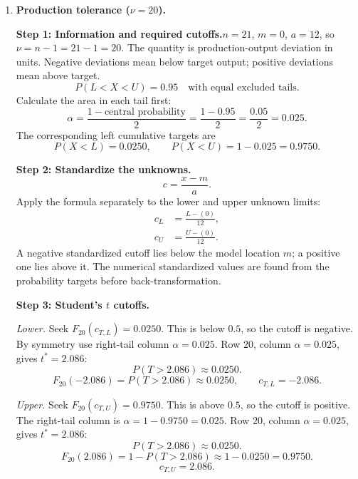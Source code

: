 \begin{enumerate}[leftmargin=*,label=\textbf{\arabic*.},itemsep=12pt,parsep=3pt,topsep=5pt]
\par\noindent\begin{minipage}{\linewidth}
\par\textbf{Step 7: Interpretation.}\nopagebreak\enspace About $10\%$ of waiting-time deviations lie below $-5.78$ minutes under $t$, or below $-5.40$ minutes under normal. Thus the thresholds represent about $5.78$ or $5.40$ minutes earlier than scheduled, respectively. The normal cutoff is $0.38$ minutes closer to the mean.
\end{minipage}\par
\item \begin{minipage}[t]{\linewidth}\textbf{Production tolerance ($\nu=20$).}\nopagebreak
\par\textbf{Step 1: Information and required cutoffs.}\nopagebreak\enspace $n=21$, $m=0$, $a=12$, so $\nu=n-1=21-1=20$. The quantity is production-output deviation in units. Negative deviations mean below target output; positive deviations mean above target.\[
P(L<X<U)=0.95\quad\text{with equal excluded tails}.
\]
Calculate the area in each tail first:\[
\alpha=\frac{1-\text{central probability}}{2}=\frac{1-0.95}{2}=\frac{0.05}{2}=0.025.
\]
The corresponding left cumulative targets are\[
P(X<L)=0.0250,\qquad P(X<U)=1-0.025=0.9750.
\]

\end{minipage}\par
\par\noindent\begin{minipage}{\linewidth}
\par\textbf{Step 2: Standardize the unknowns.}\nopagebreak\enspace \[
c=\frac{x-m}{a}.
\]
Apply the formula separately to the lower and upper unknown limits:
\[
\begin{aligned}c_L&=\frac{L-(0)}{12},\\c_U&=\frac{U-(0)}{12}.\end{aligned}
\]
A negative standardized cutoff lies below the model location $m$; a positive one lies above it. The numerical standardized values are found from the probability targets before back-transformation.
\end{minipage}\par
\par\noindent\begin{minipage}{\linewidth}
\par\textbf{Step 3: Student's $t$ cutoffs.}\nopagebreak\enspace \par\textit{Lower.} Seek $F_{20}(c_{T,L})=0.0250$. This is below $0.5$, so the cutoff is negative. By symmetry use right-tail column $\alpha=0.025$. Row $20$, column $\alpha=0.025$, gives $t^*=2.086$:\[
P(T>2.086)\approx0.0250.
\]
\[
F_{20}(-2.086)=P(T>2.086)\approx0.0250,\qquad c_{T,L}=-2.086.
\]
\par\textit{Upper.} Seek $F_{20}(c_{T,U})=0.9750$. This is above $0.5$, so the cutoff is positive. The right-tail column is $\alpha=1-0.9750=0.025$. Row $20$, column $\alpha=0.025$, gives $t^*=2.086$:\[
P(T>2.086)\approx0.0250.
\]
\[
F_{20}(2.086)=1-P(T>2.086)\approx1-0.0250=0.9750.
\]
\[
c_{T,U}=2.086.
\]


\end{minipage}
\end{enumerate}
